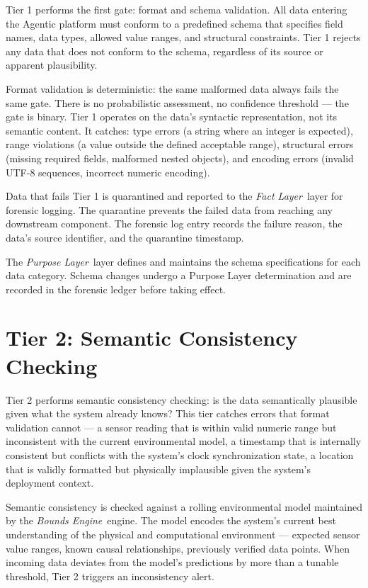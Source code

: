 \documentclass[12pt]{article}
\newcommand{\purpose}{\textit{Purpose Layer}}
\newcommand{\bounds}{\textit{Bounds Engine}}
\newcommand{\fact}{\textit{Fact Layer}}
\begin{document}
Tier 1 performs the first gate: format and schema validation. All data entering the Agentic platform must conform to a predefined schema that specifies field names, data types, allowed value ranges, and structural constraints. Tier 1 rejects any data that does not conform to the schema, regardless of its source or apparent plausibility.

Format validation is deterministic: the same malformed data always fails the same gate. There is no probabilistic assessment, no confidence threshold — the gate is binary. Tier 1 operates on the data's syntactic representation, not its semantic content. It catches: type errors (a string where an integer is expected), range violations (a value outside the defined acceptable range), structural errors (missing required fields, malformed nested objects), and encoding errors (invalid UTF-8 sequences, incorrect numeric encoding).

Data that fails Tier 1 is quarantined and reported to the \fact\ layer for forensic logging. The quarantine prevents the failed data from reaching any downstream component. The forensic log entry records the failure reason, the data's source identifier, and the quarantine timestamp.

The \purpose\ layer defines and maintains the schema specifications for each data category. Schema changes undergo a Purpose Layer determination and are recorded in the forensic ledger before taking effect.

\section{Tier 2: Semantic Consistency Checking}
\label{sec:tier2}

Tier 2 performs semantic consistency checking: is the data semantically plausible given what the system already knows? This tier catches errors that format validation cannot — a sensor reading that is within valid numeric range but inconsistent with the current environmental model, a timestamp that is internally consistent but conflicts with the system's clock synchronization state, a location that is validly formatted but physically implausible given the system's deployment context.

Semantic consistency is checked against a rolling environmental model maintained by the \bounds\ engine. The model encodes the system's current best understanding of the physical and computational environment — expected sensor value ranges, known causal relationships, previously verified data points. When incoming data deviates from the model's predictions by more than a tunable threshold, Tier 2 triggers an inconsistency alert.
\end{document}
